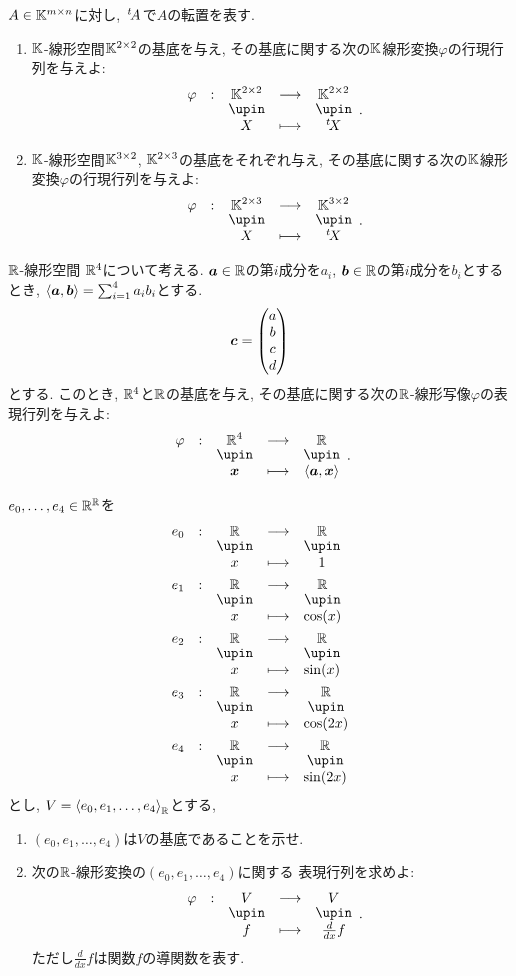 \begin{quiz}
  $A\in \mathbb{K}^{m\times n}$に対し,
  ${\left.^{t}\!A\right.}$で$A$の転置を表す.
  \begin{enumerate}
  \item
  $\mathbb{K}$-線形空間$\mathbb{K}^{2\times 2}$の基底を与え,
  その基底に関する次の$\mathbb{K}$線形変換$\varphi$の行現行列を与えよ:
  \begin{align*}
    \shazo{\varphi}{\KK^{2\times 2}}{\KK^{2\times 2}}
    {X}{\transposed{X}}.
  \end{align*}
\item
  $\mathbb{K}$-線形空間$\mathbb{K}^{3\times 2}$, $\mathbb{K}^{2\times 3}$の基底をそれぞれ与え,
  その基底に関する次の$\mathbb{K}$線形変換$\varphi$の行現行列を与えよ:
  \begin{align*}
    \shazo{\varphi}{\KK^{2\times 3}}{\KK^{3\times 2}}
    {X}{\transposed{X}}.
  \end{align*}
  \end{enumerate}
\end{quiz}

\begin{quiz}
  $\mathbb{R}$-線形空間
  $\mathbb{R}^4$について考える.
  $\boldsymbol{a}\in\mathbb{R}$の第$i$成分を$a_i$,
  $\boldsymbol{b}\in\mathbb{R}$の第$i$成分を$b_i$とするとき,  
  $\braket{\boldsymbol{a},\boldsymbol{b}}=\sum_{i=1}^4a_ib_i$とする.
  \begin{align*}
    \boldsymbol{c}=
  \begin{pmatrix}
   a\\b\\c\\d
  \end{pmatrix}
  \end{align*}
  とする.
  このとき,
  $\mathbb{R}^4$と$\mathbb{R}$の基底を与え,
  その基底に関する次の$\mathbb{R}$-線形写像$\varphi$の表現行列を与えよ:
  \begin{align*}
    \shazo{\varphi}{\RR^4}{\RR}
    {\xx}{\Braket{\aaa,\xx}}.
  \end{align*}
\end{quiz}

\begin{quiz}
  $e_0,\ldots,e_4\in \mathbb{R}^{\mathbb{R}}$を
  \begin{align*}
    &\shazo{e_0}{\RR}{\RR}{x}{1}
    \\
    &\shazo{e_1}{\RR}{\RR}{x}{\cos(x)}
    \\
    &\shazo{e_2}{\RR}{\RR}{x}{\sin(x)}
    \\
    &\shazo{e_3}{\RR}{\RR}{x}{\cos(2x)}
    \\
    &\shazo{e_4}{\RR}{\RR}{x}{\sin(2x)}
  \end{align*}
  とし,
  $V=\Braket{e_0,e_1,\ldots,e_4}_{\mathbb{R}}$とする,
  \begin{enumerate}
  \item $(e_0,e_1,\ldots,e_4)$は$V$の基底であることを示せ.
  \item 次の$\mathbb{R}$-線形変換の$(e_0,e_1,\ldots,e_4)$に関する
    表現行列を求めよ:
    \begin{align*}
    \shazo{\varphi}{V}{V}
      {f}{\frac{d}{dx}f}.
    \end{align*}
    ただし$\frac{d}{dx}f$は関数$f$の導関数を表す.
  \end{enumerate}
\end{quiz}

